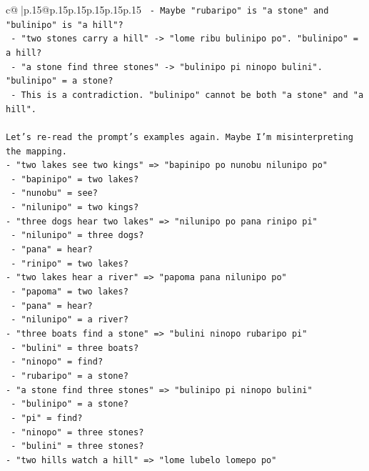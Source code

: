 \documentclass{article}
\begin{document}
{\begin{supertabular}{c@{$\;$}|p{.15\linewidth}@{}p{.15\linewidth}p{.15\linewidth}p{.15\linewidth}p{.15\linewidth}p{.15\linewidth}}
{{{\texttt{  {-} Maybe "rubaripo" is "a stone" and "bulinipo" is "a hill"?} \\
\texttt{    {-} "two stones carry a hill" {-}> "lome ribu bulinipo po". "bulinipo" = a hill?} \\
\texttt{    {-} "a stone find three stones" {-}> "bulinipo pi ninopo bulini". "bulinipo" = a stone?} \\
\texttt{    {-} This is a contradiction. "bulinipo" cannot be both "a stone" and "a hill".} \\
\\ 
\texttt{Let's re{-}read the prompt's examples again. Maybe I'm misinterpreting the mapping.} \\
\texttt{{-} "two lakes see two kings" => "bapinipo po nunobu nilunipo po"} \\
\texttt{  {-} "bapinipo" = two lakes?} \\
\texttt{  {-} "nunobu" = see?} \\
\texttt{  {-} "nilunipo" = two kings?} \\
\texttt{{-} "three dogs hear two lakes" => "nilunipo po pana rinipo pi"} \\
\texttt{  {-} "nilunipo" = three dogs?} \\
\texttt{  {-} "pana" = hear?} \\
\texttt{  {-} "rinipo" = two lakes?} \\
\texttt{{-} "two lakes hear a river" => "papoma pana nilunipo po"} \\
\texttt{  {-} "papoma" = two lakes?} \\
\texttt{  {-} "pana" = hear?} \\
\texttt{  {-} "nilunipo" = a river?} \\
\texttt{{-} "three boats find a stone" => "bulini ninopo rubaripo pi"} \\
\texttt{  {-} "bulini" = three boats?} \\
\texttt{  {-} "ninopo" = find?} \\
\texttt{  {-} "rubaripo" = a stone?} \\
\texttt{{-} "a stone find three stones" => "bulinipo pi ninopo bulini"} \\
\texttt{  {-} "bulinipo" = a stone?} \\
\texttt{  {-} "pi" = find?} \\
\texttt{  {-} "ninopo" = three stones?} \\
\texttt{  {-} "bulini" = three stones?} \\
\texttt{{-} "two hills watch a hill" => "lome lubelo lomepo po"} \\
}}}
\end{supertabular}}
\end{document}
